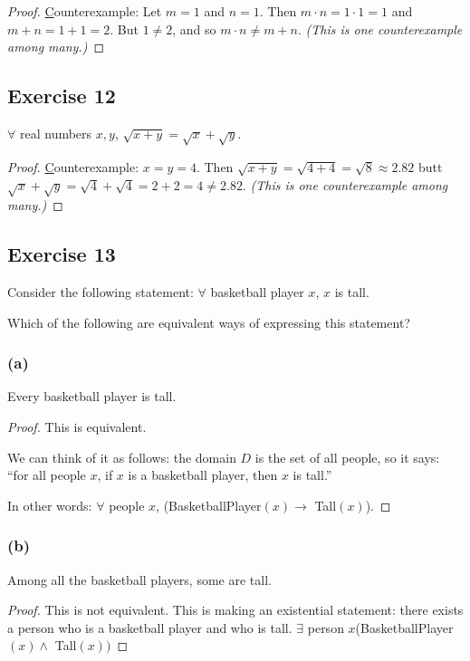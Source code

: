 \documentclass[14pt]{extarticle}
\newcommand{\fa}{\forall}
\newcommand{\te}{\exists}
\begin{document}
\begin{proof}
{\underline Counterexample}: Let $m = 1$ and $n = 1$. Then $m\cdot n = 1\cdot 1 = 1$ and $m + n = 1 + 1 = 2$. But $1 \neq 2$, and so $m\cdot n \neq m + n$. {\it (This is one counterexample among many.)}
\end{proof}

\subsection{Exercise 12}
$\fa$ real numbers $x, y$, $\sqrt{x + y} = \sqrt{x} + \sqrt{y}$.

\begin{proof}
{\underline Counterexample}: $x = y = 4$. Then $\sqrt{x + y} = \sqrt{4 + 4} = \sqrt{8} \approx 2.82$ butt $\sqrt{x} + \sqrt{y} = \sqrt{4} + \sqrt{4} = 2 + 2 = 4 \neq 2.82$. {\it (This is one counterexample among many.)}
\end{proof}

\subsection{Exercise 13}
Consider the following statement: $\fa$ basketball player $x$, $x$ is tall.

Which of the following are equivalent ways of expressing this statement?

\subsubsection{(a)}
Every basketball player is tall.

\begin{proof}
This is equivalent. 

We can think of it as follows: the domain $D$ is the set of all people, so it says: ``for all people $x$, if $x$ is a basketball player, then $x$ is tall.''

In other words: $\fa$ people $x$, (BasketballPlayer$(x) \to$ Tall$(x)$).
\end{proof}

\subsubsection{(b)}
Among all the basketball players, some are tall.

\begin{proof}
This is not equivalent. This is making an existential statement: there exists a person who is a basketball player and who is tall. $\te$ person $x$(BasketballPlayer$(x) \wedge$ Tall$(x))$
\end{proof}
\end{document}
